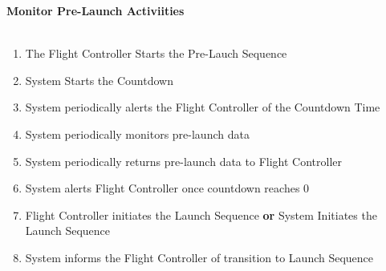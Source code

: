 \documentclass[letterpaper]{article}
\begin{document}
\noindent
\textbf{Monitor Pre-Launch Activiities}\\\\
\begin{enumerate}
\item The Flight Controller Starts the Pre-Lauch
Sequence
\item System Starts the Countdown
\item System periodically alerts the Flight Controller of the Countdown
Time
\item System periodically monitors pre-launch data
\item System periodically returns pre-launch data to Flight Controller
\item System alerts Flight Controller once countdown reaches 0
\item Flight Controller initiates the Launch Sequence \textbf{or}
System Initiates the Launch Sequence
\item System informs the Flight Controller of transition to Launch
Sequence
\end{enumerate}
\end{document}
